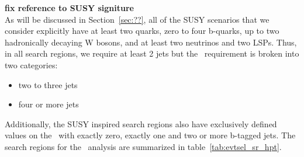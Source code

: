 {\bf \color{red} fix reference to SUSY signiture} \\
As will be discussed in Section~\ref{sec:??}, all of the SUSY scenarios that we
consider explicitly have at least two quarks, zero to four b-quarks, up to two
hadronically decaying W bosons, and at least two neutrinos and two LSPs. Thus,
in all search regions, we require at least 2 jets but the \njets~requirement is
broken into two categories:
\begin{itemize}
\item two to three jets
\item four or more jets 
\end{itemize}
Additionally, the SUSY inspired search regions also have exclusively defined
values on the \nbtags~with exactly zero, exactly one and two or more b-tagged
jets.
The search regions for the \hpt~analysis are summarized in
table~\ref{tab:evtsel_sr_hpt}.

